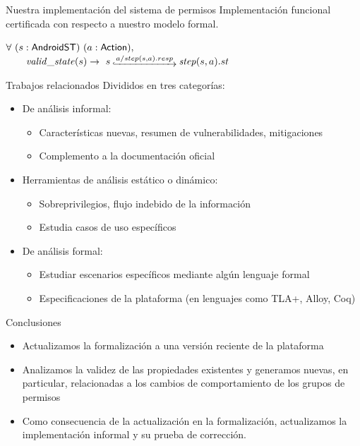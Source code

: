\documentclass[pdf, handout]{beamer} %
\begin{document}
\begin{frame}{Nuestra implementación del sistema de permisos}
    Implementación funcional certificada con respecto a nuestro modelo formal.
    \pause \vspace{20px}
    \begin{theorem}
        $ \forall\ (s:\AndroidState)\ (a:\Action),$ \\
        $\quad \quad \ap{valid\_state}{s} \rightarrow\ s\step{a/step(s,a).resp} \bap{step}{s}{a}.st$
    \end{theorem}
\end{frame}

\begin{frame}{Trabajos relacionados}
    Divididos en tres categorías:
    \pause
    \begin{itemize}[<+->]
        \item De análisis informal:
              \begin{itemize}
                  \item Características nuevas, resumen de vulnerabilidades, mitigaciones
                  \item Complemento a la documentación oficial
              \end{itemize}
        \item Herramientas de análisis estático o dinámico:
              \begin{itemize}
                  \item Sobreprivilegios, flujo indebido de la información
                  \item Estudia casos de uso específicos
              \end{itemize}
        \item De análisis formal:
              \begin{itemize}
                  \item Estudiar escenarios específicos mediante algún lenguaje formal
                  \item Especificaciones de la plataforma (en lenguajes como TLA+, Alloy, Coq)
              \end{itemize}
    \end{itemize}
\end{frame}

\begin{frame}{Conclusiones}
    \begin{itemize}[<+->]
        \item Actualizamos la formalización a una versión reciente de la plataforma
        \item Analizamos la validez de las propiedades existentes y generamos nuevas, en particular,
              relacionadas a los cambios de comportamiento de los grupos de permisos
        \item Como consecuencia de la actualización en la formalización, actualizamos la
              implementación informal  y su prueba de corrección.
    \end{itemize}
\end{frame}
\end{document}
